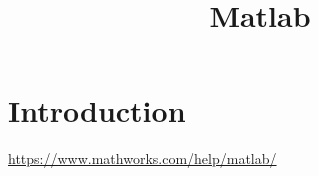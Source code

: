 \documentclass{blog}
\title{Matlab}
\begin{document}
\maketitle
\tableofcontents
\section{Introduction}
\url{https://www.mathworks.com/help/matlab/}

\printbibliography
\end{document}

